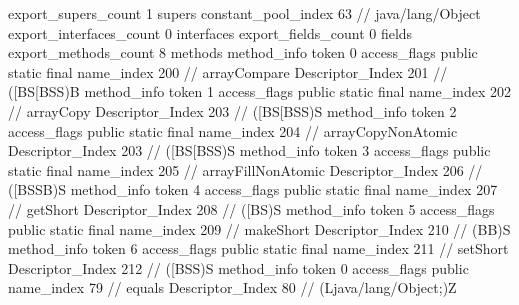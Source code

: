 {{{			export_supers_count	1
			supers {
				constant_pool_index	63		// java/lang/Object
			}
			export_interfaces_count	0
			interfaces {
			}
			export_fields_count	0
			fields {
			}
			export_methods_count	8
			methods {
				method_info {
					token	0
					access_flags	public static final
					name_index	200		// arrayCompare
					Descriptor_Index	201		// ([BS[BSS)B
				}
				method_info {
					token	1
					access_flags	public static final
					name_index	202		// arrayCopy
					Descriptor_Index	203		// ([BS[BSS)S
				}
				method_info {
					token	2
					access_flags	public static final
					name_index	204		// arrayCopyNonAtomic
					Descriptor_Index	203		// ([BS[BSS)S
				}
				method_info {
					token	3
					access_flags	public static final
					name_index	205		// arrayFillNonAtomic
					Descriptor_Index	206		// ([BSSB)S
				}
				method_info {
					token	4
					access_flags	public static final
					name_index	207		// getShort
					Descriptor_Index	208		// ([BS)S
				}
				method_info {
					token	5
					access_flags	public static final
					name_index	209		// makeShort
					Descriptor_Index	210		// (BB)S
				}
				method_info {
					token	6
					access_flags	public static final
					name_index	211		// setShort
					Descriptor_Index	212		// ([BSS)S
				}
				method_info {
					token	0
					access_flags	public
					name_index	79		// equals
					Descriptor_Index	80		// (Ljava/lang/Object;)Z
				}
			}
		}
	}
}
